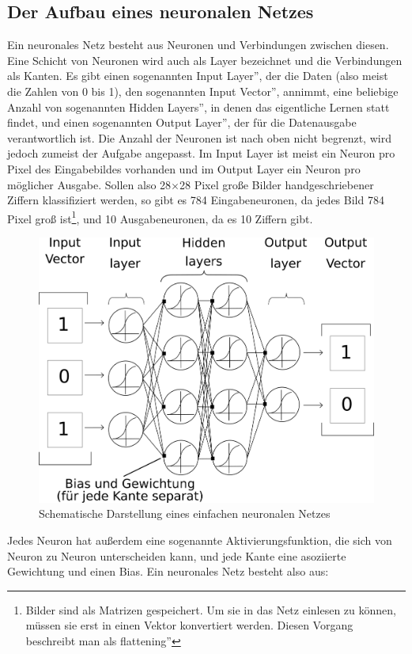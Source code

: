 \documentclass[11pt]{article}
\begin{document}
\subsection{Der Aufbau eines neuronalen Netzes}
Ein neuronales Netz besteht aus Neuronen und Verbindungen zwischen diesen. Eine Schicht von Neuronen wird auch als Layer bezeichnet und die Verbindungen als Kanten. Es gibt einen sogenannten \glqq Input Layer'', der die Daten (also meist die Zahlen von 0 bis 1), den sogenannten \glqq Input Vector'', annimmt, eine beliebige Anzahl von sogenannten \glqq Hidden Layers'', in denen das eigentliche Lernen statt findet, und einen sogenannten \glqq Output Layer'', der für die Datenausgabe verantwortlich ist. Die Anzahl der Neuronen ist nach oben nicht begrenzt, wird jedoch zumeist der Aufgabe angepasst. Im Input Layer ist meist ein Neuron pro Pixel des Eingabebildes vorhanden und im Output Layer ein Neuron pro möglicher Ausgabe. Sollen also 28$\times$28 Pixel große Bilder handgeschriebener Ziffern klassifiziert werden, so gibt es 784 Eingabeneuronen, da jedes Bild 784 Pixel groß ist\footnote{Bilder sind als Matrizen gespeichert. Um sie in das Netz einlesen zu können, müssen sie erst in einen Vektor konvertiert werden. Diesen Vorgang beschreibt man als \glqq flattening''}, und 10 Ausgabeneuronen, da es 10 Ziffern gibt.
\begin{figure}[h]
\centering
\includegraphics[width=\linewidth]{../graphics/Neural_Net.png}
\caption{Schematische Darstellung eines einfachen neuronalen Netzes}
\end{figure}
Jedes Neuron hat außerdem eine sogenannte Aktivierungsfunktion, die sich von Neuron zu Neuron unterscheiden kann, und jede Kante eine asoziierte Gewichtung und einen Bias. Ein neuronales Netz besteht also aus:
\end{document}
